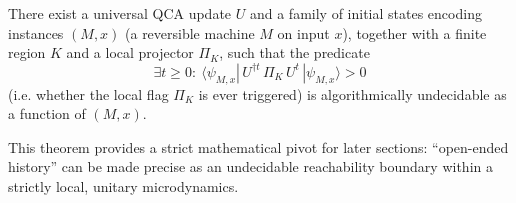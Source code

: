 \begin{theorem}
\label{thm:undecidable_reachability}
There exist a universal QCA update $U$ and a family of initial states encoding instances $(M,x)$ (a reversible machine $M$ on input $x$), together with a finite region $K$ and a local projector $\Pi_K$, such that the predicate
\begin{equation}
\exists t\ge 0:\ \langle\psi_{M,x}|\,U^{\dagger t}\,\Pi_K\,U^t\,|\psi_{M,x}\rangle > 0
\end{equation}
(i.e. whether the local flag $\Pi_K$ is ever triggered) is algorithmically undecidable as a function of $(M,x)$.
\end{theorem}

This theorem provides a strict mathematical pivot for later sections: ``open-ended history'' can be made precise as an undecidable reachability boundary within a strictly local, unitary microdynamics.
